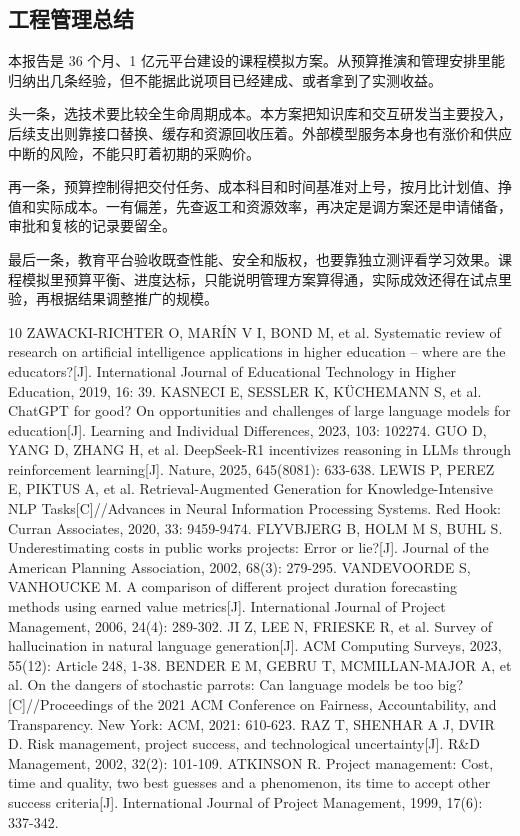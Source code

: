 \documentclass[UTF8,12pt,a4paper]{ctexart}
\begin{document}
\subsection{工程管理总结}
本报告是 36 个月、1 亿元平台建设的课程模拟方案。从预算推演和管理安排里能归纳出几条经验，但不能据此说项目已经建成、或者拿到了实测收益。

头一条，选技术要比较全生命周期成本。本方案把知识库和交互研发当主要投入，后续支出则靠接口替换、缓存和资源回收压着。外部模型服务本身也有涨价和供应中断的风险，不能只盯着初期的采购价。

再一条，预算控制得把交付任务、成本科目和时间基准对上号，按月比计划值、挣值和实际成本。一有偏差，先查返工和资源效率，再决定是调方案还是申请储备，审批和复核的记录要留全。

最后一条，教育平台验收既查性能、安全和版权，也要靠独立测评看学习效果。课程模拟里预算平衡、进度达标，只能说明管理方案算得通，实际成效还得在试点里验，再根据结果调整推广的规模。

\clearpage
\begin{thebibliography}{10}
 ZAWACKI-RICHTER O, MAR\'IN V I, BOND M, et al. Systematic review of research on artificial intelligence applications in higher education -- where are the educators?[J]. International Journal of Educational Technology in Higher Education, 2019, 16: 39.
 KASNECI E, SESSLER K, K\"UCHEMANN S, et al. ChatGPT for good? On opportunities and challenges of large language models for education[J]. Learning and Individual Differences, 2023, 103: 102274.
 GUO D, YANG D, ZHANG H, et al. DeepSeek-R1 incentivizes reasoning in LLMs through reinforcement learning[J]. Nature, 2025, 645(8081): 633-638.
 LEWIS P, PEREZ E, PIKTUS A, et al. Retrieval-Augmented Generation for Knowledge-Intensive NLP Tasks[C]//Advances in Neural Information Processing Systems. Red Hook: Curran Associates, 2020, 33: 9459-9474.
 FLYVBJERG B, HOLM M S, BUHL S. Underestimating costs in public works projects: Error or lie?[J]. Journal of the American Planning Association, 2002, 68(3): 279-295.
 VANDEVOORDE S, VANHOUCKE M. A comparison of different project duration forecasting methods using earned value metrics[J]. International Journal of Project Management, 2006, 24(4): 289-302.
 JI Z, LEE N, FRIESKE R, et al. Survey of hallucination in natural language generation[J]. ACM Computing Surveys, 2023, 55(12): Article 248, 1-38.
 BENDER E M, GEBRU T, MCMILLAN-MAJOR A, et al. On the dangers of stochastic parrots: Can language models be too big?[C]//Proceedings of the 2021 ACM Conference on Fairness, Accountability, and Transparency. New York: ACM, 2021: 610-623.
 RAZ T, SHENHAR A J, DVIR D. Risk management, project success, and technological uncertainty[J]. R\&D Management, 2002, 32(2): 101-109.
 ATKINSON R. Project management: Cost, time and quality, two best guesses and a phenomenon, its time to accept other success criteria[J]. International Journal of Project Management, 1999, 17(6): 337-342.
\end{thebibliography}
\end{document}
